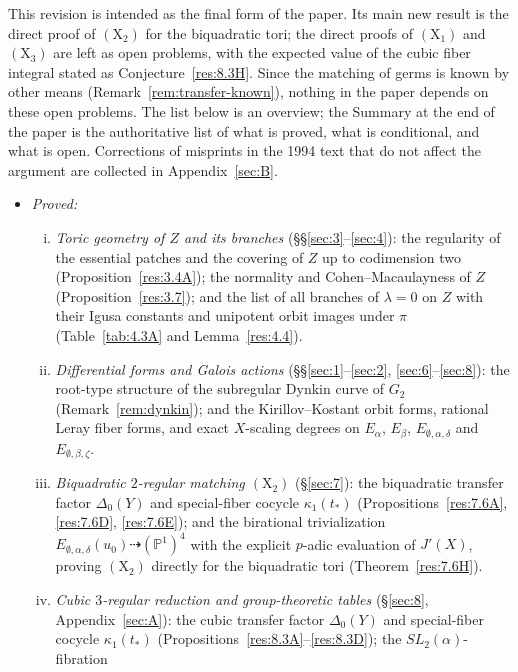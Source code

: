 \documentclass[12pt,letterpaper]{amsart}
\theoremstyle{plain}
\theoremstyle{definition}
\theoremstyle{remark}
\theoremstyle{definition}
\begin{document}
This revision is intended as the final form of the paper. Its main new result
is the direct proof of $(\mathrm X_2)$ for the biquadratic tori; the direct
proofs of $(\mathrm X_1)$ and $(\mathrm X_3)$ are left as open problems,
with the expected value of the cubic fiber integral stated as
Conjecture~\ref{res:8.3H}. Since the matching of germs is known by other means
(Remark~\ref{rem:transfer-known}), nothing in the paper depends on these open
problems. The list below is an overview; the Summary at the end of the paper is
the authoritative list of what is proved, what is conditional, and what is
open. Corrections of
misprints in the 1994 text that do not affect the argument are collected in
Appendix~\ref{sec:B}.

\begin{itemize}
\item \emph{Proved:}
\begin{enumerate}[(i)]
\item \emph{Toric geometry of $Z$ and its branches} (\S\S\ref{sec:3}--\ref{sec:4}):
the regularity of the essential patches and the
covering of $Z$ up to codimension two (Proposition~\ref{res:3.4A}); the
normality and Cohen--Macaulayness of $Z$ (Proposition~\ref{res:3.7}); and the
list of all branches of $\lambda=0$ on $Z$ with their Igusa constants and
unipotent orbit images under $\pi$ (Table~\ref{tab:4.3A} and
Lemma~\ref{res:4.4}).
\item \emph{Differential forms and Galois actions} (\S\S\ref{sec:1}--\ref{sec:2},
\ref{sec:6}--\ref{sec:8}): the root-type structure of the subregular Dynkin
curve of $G_2$ (Remark~\ref{rem:dynkin}); and the Kirillov--Kostant orbit
forms, rational Leray fiber forms, and exact $X$-scaling degrees on
$E_\alpha$, $E_\beta$, $E_{\emptyset,\alpha,\delta}$ and
$E_{\emptyset,\beta,\zeta}$.
\item \emph{Biquadratic $2$-regular matching $(\mathrm X_2)$} (\S\ref{sec:7}):
the biquadratic transfer factor $\Delta_0(Y)$ and special-fiber cocycle
$\kappa_1(t_*)$ (Propositions~\ref{res:7.6A}, \ref{res:7.6D}, \ref{res:7.6E});
and the birational trivialization
$E_{\emptyset,\alpha,\delta}(u_0)\dashrightarrow(\mathbb{P}^1)^4$
with the explicit $p$-adic evaluation of $J'(X)$, proving $(\mathrm X_2)$
directly for the biquadratic tori (Theorem~\ref{res:7.6H}).
\item \emph{Cubic $3$-regular reduction and group-theoretic tables}
(\S\ref{sec:8}, Appendix~\ref{sec:A}): the cubic transfer factor
$\Delta_0(Y)$ and special-fiber cocycle $\kappa_1(t_*)$
(Propositions~\ref{res:8.3A}--\ref{res:8.3D}); the $SL_2(\alpha)$-fibration

\end{enumerate}
\end{itemize}
\end{document}
